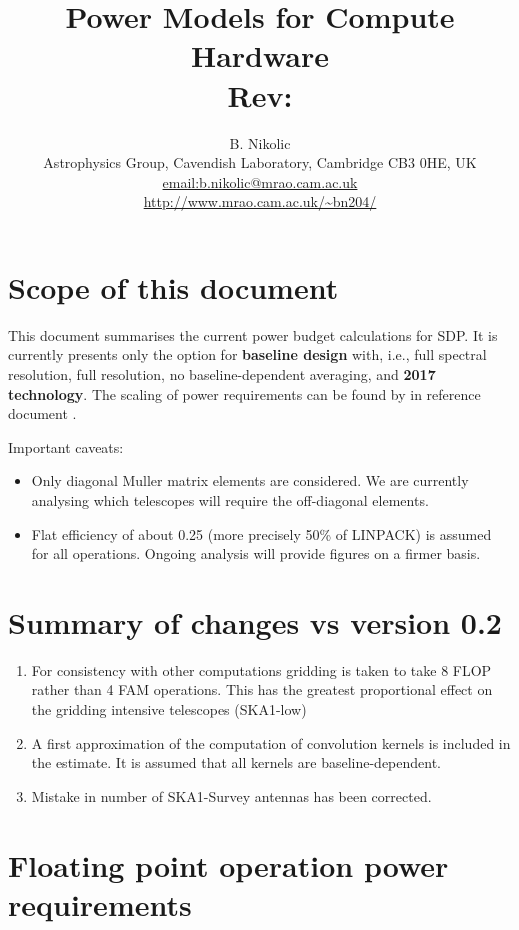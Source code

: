\documentclass[useAMS,usenatbib,referee]{article}
\title{Power Models for Compute Hardware\\
  Rev: }
\author{B. Nikolic\\
  Astrophysics Group, Cavendish Laboratory, Cambridge CB3 0HE, UK
  \\\url{email:b.nikolic@mrao.cam.ac.uk}
 \\\url{http://www.mrao.cam.ac.uk/~bn204/}}
\begin{document}
\maketitle

\tableofcontents

\section{Scope of this document}

This document summarises the current power budget calculations for
SDP. It is currently presents only the option for {\bf baseline
  design} with, i.e., full spectral resolution, full resolution, no
baseline-dependent averaging, and {\bf 2017 technology}. The scaling
of power requirements can be found by in reference document
\cite{MajCycleModel}. 

Important caveats:
\begin{itemize}
\item Only diagonal Muller matrix elements are considered. We are
  currently analysing which telescopes will require the off-diagonal
  elements.
\item Flat efficiency of about 0.25 (more precisely 50\% of LINPACK)
  is assumed for all operations. Ongoing analysis will provide
  figures on a firmer basis.
\end{itemize}


\section{Summary of changes vs version 0.2}

\begin{enumerate}
\item For consistency with other computations gridding is taken to
  take 8 FLOP rather than 4 FAM operations. This has the greatest
  proportional effect on the gridding intensive telescopes (SKA1-low)
\item A first approximation of the computation of convolution kernels
  is included in the estimate. It is assumed that all kernels are
  baseline-dependent.
\item Mistake in number of SKA1-Survey antennas has been corrected. 
\end{enumerate}


\section{Floating point operation power requirements}
\end{document}
